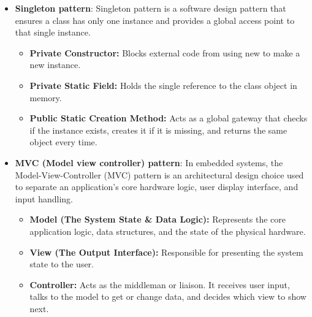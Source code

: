 \documentclass{report}
\begin{document}
\begin{itemize}
        \item \textbf{Singleton pattern}:  Singleton pattern is a software design pattern that ensures a class has only one instance and provides a global access point to that single instance.
            \begin{itemize}
                \item \textbf{Private Constructor:} Blocks external code from using new to make a new instance.
                \item \textbf{Private Static Field:} Holds the single reference to the class object in memory.
                \item \textbf{Public Static Creation Method:} Acts as a global gateway that checks if the instance exists, creates it if it is missing, and returns the same object every time.
            \end{itemize}
        \item \textbf{MVC (Model view controller) pattern}:  In embedded systems, the Model-View-Controller (MVC) pattern is an architectural design choice used to separate an application's core hardware logic, user display interface, and input handling.
            \begin{itemize}
                \item \textbf{Model (The System State \& Data Logic):} Represents the core application logic, data structures, and the state of the physical hardware. 
                \item \textbf{View (The Output Interface):} Responsible for presenting the system state to the user.
                \item \textbf{Controller:} Acts as the middleman or liaison. It receives user input, talks to the model to get or change data, and decides which view to show next.
            \end{itemize}
            \bigbreak \noindent 


    \end{itemize}
\end{document}
